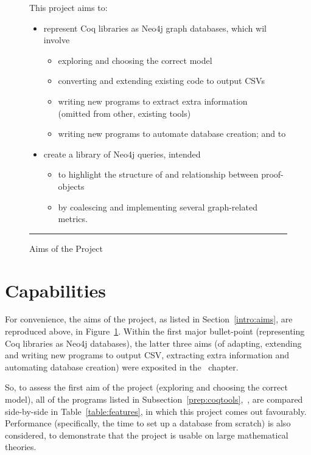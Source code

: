 \begin{figure}[tbp]

  \raggedright
  This project aims to:

  \begin{itemize}
  \item represent Coq libraries as Neo4j graph databases, which wil involve
    \begin{itemize}
    \item exploring and choosing the correct model
    \item converting and extending existing code to output CSVs
    \item writing new programs to extract extra information \\
        (omitted from other, existing tools)
    \item writing new programs to automate database creation; and to
    \end{itemize}

  \item create a library of Neo4j queries, intended
    \begin{itemize}
    \item to highlight the structure of and relationship between proof-objects
    \item by coalescing and implementing several graph-related metrics.
    \end{itemize}
  \end{itemize}

  \hrule%
  \caption{Aims of the Project}\label{fig:aims}

\end{figure}

\section{Capabilities}\label{eval:compare}

For convenience, the aims of the project, as listed in
Section~\ref{intro:aims}, are reproduced above, in Figure~\ref{fig:aims}.
Within the first major bullet-point (representing Coq libraries as Neo4j
databases), the latter three aims (of adapting, extending and writing new
programs to output CSV, extracting extra information and automating database
creation) were exposited in the~ chapter.

So, to assess the first aim of the project (exploring and choosing the
correct model), all of the programs listed in
Subsection~\ref{prep:coqtools},~, are compared
side-by-side in Table~\ref{table:features}, in which this project comes out
favourably. Performance (specifically, the time to set up a database from
scratch) is also considered, to demonstrate that the project is usable on large
mathematical theories. 

